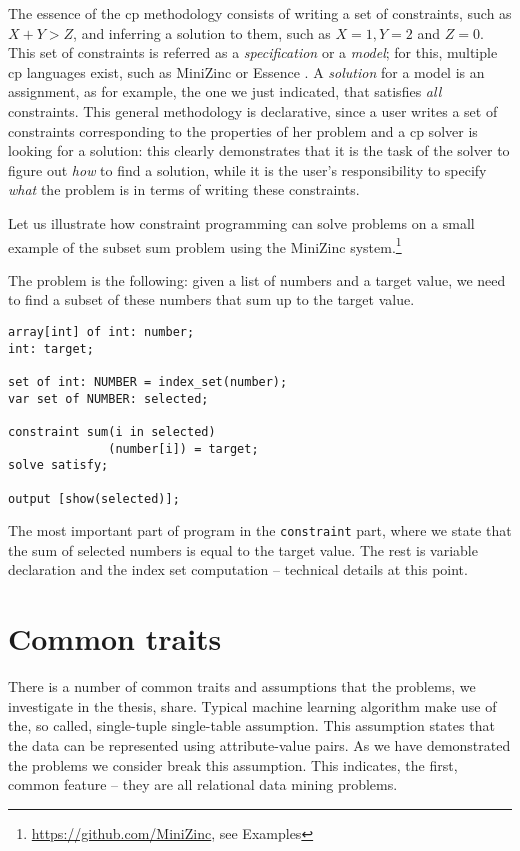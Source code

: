 The essence of the \acrshort{cp} methodology consists of writing a set of
constraints, such as $X + Y > Z$, and inferring a solution to them, such
as $X = 1, Y = 2$ and $Z = 0$. This set of constraints is referred as
a \textit{specification} or a \textit{model}; for this, multiple \acrlong{cp}
languages exist, such as MiniZinc \parencite{minizinc} or Essence
\parencite{essence}. A \textit{solution} for
a model is an assignment, as for example, the one we just indicated, that satisfies
\textit{all} constraints. This general methodology is declarative,
since a user writes a set of constraints corresponding to the
properties of her problem and a \acrshort{cp} solver is looking for a
solution: this clearly demonstrates that it is the task of the solver
to figure out \textit{how} to find a solution, while it is the user's
responsibility to specify \textit{what} the problem is in terms of
writing these constraints.

\begin{example}
    Let us illustrate how constraint programming can solve problems on
    a small example of the subset sum problem using the MiniZinc
    system.\footnote{\url{https://github.com/MiniZinc}, see Examples} 

The problem is the following: given a list of numbers and a target
    value, we need to find a subset of these numbers that sum up to
    the target value.
    \begin{minipage}{\linewidth}
    \begin{lstlisting}[caption=An example of a MiniZinc program, label=lst:example_asp_program,basicstyle=\ttfamily]
array[int] of int: number;
int: target;

set of int: NUMBER = index_set(number);
var set of NUMBER: selected;

constraint sum(i in selected)
              (number[i]) = target;
solve satisfy;

output [show(selected)];
\end{lstlisting}
\end{minipage}
The most important part of program in the \texttt{constraint}
part, where we state that the sum of selected numbers is equal to
the target value. The rest is variable declaration and the index
set computation -- technical details at this point.
\end{example}


\pubrev
\section{Common traits}\label{sec:common}
There is a number of common traits and assumptions that the problems, we
investigate in the thesis, share. Typical machine learning algorithm
make use of the, so called, single-tuple single-table assumption. This
assumption states that the data can be represented using
attribute-value pairs. As we have demonstrated the problems we
consider break this assumption. This indicates, the first, common
feature -- they are all relational data  mining problems. 

